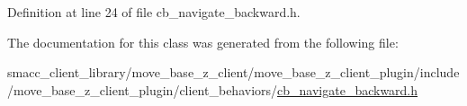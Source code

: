 Definition at line 24 of file cb\+\_\+navigate\+\_\+backward.\+h.



The documentation for this class was generated from the following file\+:\begin{DoxyCompactItemize}
\item 
smacc\+\_\+client\+\_\+library/move\+\_\+base\+\_\+z\+\_\+client/move\+\_\+base\+\_\+z\+\_\+client\+\_\+plugin/include/move\+\_\+base\+\_\+z\+\_\+client\+\_\+plugin/client\+\_\+behaviors/\hyperlink{smacc__client__library_2move__base__z__client_2move__base__z__client__plugin_2include_2move__basef18dba82c6c9ec751438c97ecb125e5}{cb\+\_\+navigate\+\_\+backward.\+h}\end{DoxyCompactItemize}
